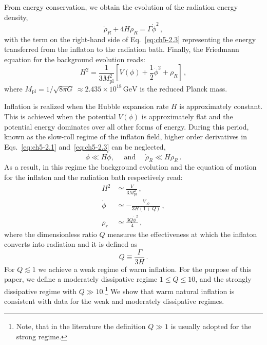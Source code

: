 From energy conservation, we obtain the evolution of the radiation energy density,
\begin{equation}
    \Dot{\rho}_R+4H\rho_R=\Gamma \Dot{\phi}^2\,,  \label{eq:ch5-2.3}
\end{equation}
with the term on the right-hand side of Eq.~\ref{eq:ch5-2.3} representing the energy transferred from the inflaton to the radiation bath.
Finally, the Friedmann equation for the background evolution reads:
\begin{equation}
    H^2=\frac{1}{3M_{\mathrm{pl}}^2}\left[V(\phi)+\frac{1}{2}\Dot{\phi}^2+\rho_R\right]\,,  \label{eq:ch5-2.4}
\end{equation}
where $M_{\mathrm{pl}} = 1/\sqrt{8 \pi G} \, \approx 2.435\times 10^{18}\,\mathrm{GeV}$ is the reduced Planck mass.

Inflation is realized when the Hubble expansion rate $H$ is approximately constant. This is achieved when the potential $V(\phi)$ is approximately flat and the potential energy dominates over all other forms of energy. During this period, known as the slow-roll regime of the inflaton field, higher order derivatives in Eqs.~\ref{eq:ch5-2.1} and~\ref{eq:ch5-2.3} can be neglected,
\begin{equation}
    \ddot{\phi} \ll H \dot{\phi}, \quad \text { and } \quad \dot{\rho}_{R} \ll H \rho_{R}\,. \label{eq:ch5-2.5}
\end{equation}
As a result, in this regime the background evolution and the equation of motion for the inflaton and the radiation bath respectively read:
\begin{align}
    H^2&\simeq \frac{V}{3M_{\mathrm{pl}}^2}\,, \label{eq:ch5-SR1} \\
    \Dot{\phi}&\simeq -\frac{V_{,\phi}}{3H(1+Q)}\,, \label{eq:ch5-SR2}\\
    \rho_r&\simeq \frac{3Q \Dot{\phi}^2}{4}\,,\label{eq:ch5-SR3}
\end{align}
where the dimensionless ratio $Q$ measures the effectiveness at which the inflaton converts into radiation and it is defined as
\begin{equation}
    Q \equiv \frac{\Gamma}{3 H}\,.
\end{equation}
For $Q\lesssim 1$ we achieve a weak regime of warm inflation. For the purpose of this paper, we define a moderately dissipative regime $1\leq Q\leq 10$, and the strongly dissipative regime with $Q \gg 10$.\footnote{Note, that in the literature the definition $Q \gg 1$ is usually adopted for the strong regime.} We show that warm natural inflation is consistent with data for the weak and moderately dissipative regimes.

